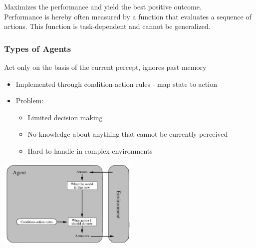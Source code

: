 \documentclass[
../../EiKI_Summary.tex,
]
{subfiles}
\begin{document}
\begin{defbox}
    Maximizes the performance and yield the best positive outcome. \\
    Performance is hereby often measured by a function that evaluates a sequence of actions. This function is task-dependent and cannot be generalized.
\end{defbox}

\subsubsection{Types of Agents}

\begin{defbox}
    Act only on the basis of the current percept, ignores past memory
    \begin{itemize}
        \item Implemented through condition-action rules - map state to action
        \item Problem:
        \begin{itemize}
            \item Limited decision making
            \item No knowledge about anything that cannot be currently perceived
            \item Hard to handle in complex environments
        \end{itemize}
    \end{itemize}
    
    \begin{center}
        \includegraphics[width=0.5\textwidth]{Pics/2/ReflexAgent.png}
    \end{center}
\end{defbox}
\end{document}
